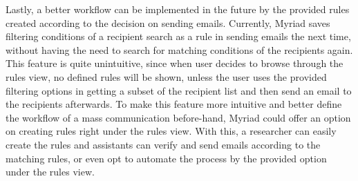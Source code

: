 Lastly, a better workflow can be implemented in the future by the provided rules created according to the decision on sending emails. Currently, Myriad saves filtering conditions of a recipient search as a rule in sending emails the next time, without having the need to search for matching conditions of the recipients again. This feature is quite unintuitive, since when user decides to browse through the rules view, no defined rules will be shown, unless the user uses the provided filtering options in getting a subset of the recipient list and then send an email to the recipients afterwards. To make this feature more intuitive and better define the workflow of a mass communication before-hand, Myriad could offer an option on creating rules right under the rules view. With this, a researcher can easily create the rules and assistants can verify and send emails according to the matching rules, or even opt to automate the process by the provided option under the rules view.

 